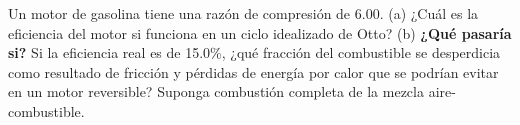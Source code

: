 \item Un motor de gasolina tiene una razón de compresión de 6.00. (a) ¿Cuál es la eficiencia del motor si funciona en un ciclo idealizado de Otto? (b) \textbf{¿Qué pasaría si?} Si la eficiencia real es de 15.0\%, ¿qué fracción del combustible se desperdicia como resultado de fricción y pérdidas de energía por calor que se podrían evitar en un motor reversible? Suponga combustión completa de la mezcla aire-combustible.
